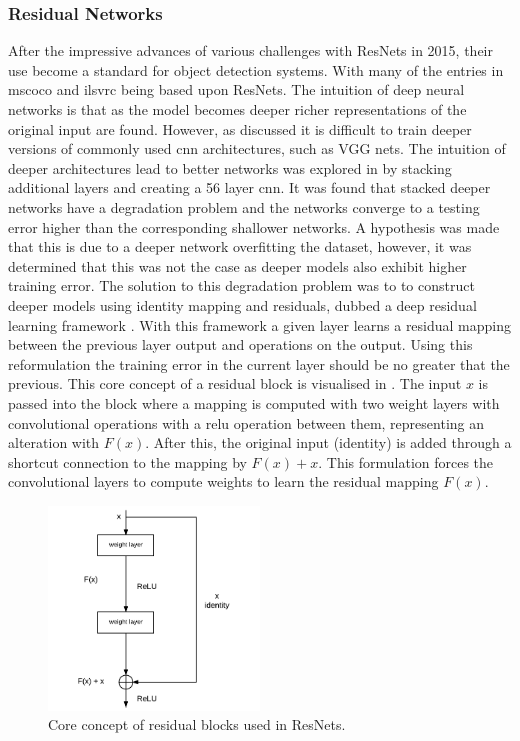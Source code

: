 \subsubsection{Residual Networks}
After the impressive advances of various challenges with ResNets in 2015, their use become a standard for object detection systems. With many of the entries in \gls{mscoco} and \gls{ilsvrc} being based upon ResNets. The intuition of deep neural networks is that as the model becomes deeper richer representations of the original input are found. However, as discussed it is difficult to train deeper versions of commonly used \gls{cnn} architectures, such as VGG nets. The intuition of deeper architectures lead to better networks was explored in \cite{deepres} by stacking additional layers and creating a 56 layer \gls{cnn}. It was found that stacked deeper networks have a degradation problem and the networks converge to a testing error higher than the corresponding shallower networks. A hypothesis was made that this is due to a deeper network overfitting the dataset, however, it was determined that this was not the case as deeper models also exhibit higher training error. The solution to this degradation problem was to to construct deeper models using identity mapping and residuals, dubbed a deep residual learning framework \cite{deepres}. With this framework a given layer learns a residual mapping between the previous layer output and operations on the output. Using this reformulation the training error in the current layer should be no greater that the previous. This core concept of a residual block is visualised in . The input $x$ is passed into the block where a mapping is computed with two weight layers with convolutional operations with a \gls{relu} operation between them, representing an alteration with $F(x)$. After this, the original input (identity) is added through a shortcut connection to the mapping by $F(x) + x$. This formulation forces the convolutional layers to compute weights to learn the residual mapping $F(x)$. 

\begin{figure}[H]
  \centering
    \includegraphics[width=0.5\textwidth]{Figs/Techanal/resblock.pdf}
    \caption{Core concept of residual blocks used in ResNets.}
    \label{fig:resblock}
\end{figure}

